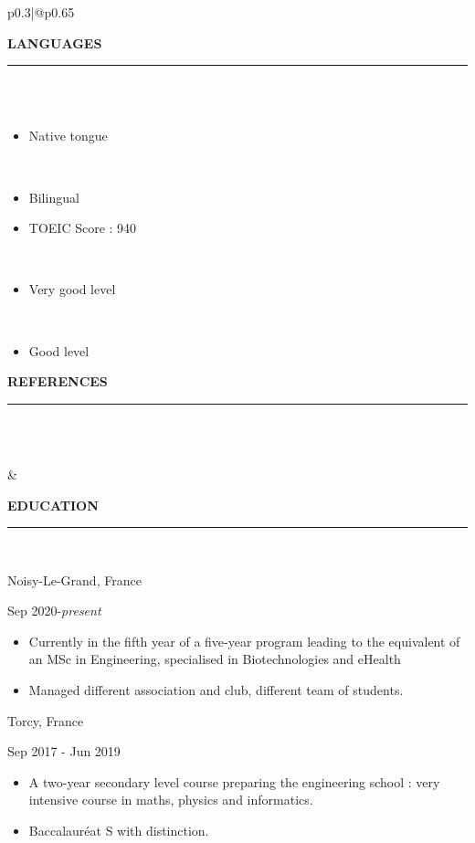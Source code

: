 \documentclass[12pt,a4paper]{article}
\newcommand{\myline}[1]{\rule{#1}{1.0pt}\\}
\newcommand{\topic}[1]{\textbf{\Large\selectfont\MakeUppercase{#1}}\\\vspace{-0.5cm}\myline{1.0cm}}
\newcommand{\subtopic}[1]{\textbf{\normalsize\selectfont{#1}}\\}
\newcommand{\lsubtopic}[3]{
  \begin{minipage}[t]{0.7\linewidth}
    \textbf{\normalsize\selectfont{#1}}
  \end{minipage}
  \hfill
  \begin{minipage}[t]{0.25\linewidth}
    \raggedleft
    {#2\\}
  \end{minipage}
  \par
}
\begin{document}
\begin{multicols}{2}
\begin{tabular}{p{0.3\textwidth}|@{\hspace{5mm}}p{0.65\textwidth}}
{\begin{flushleft}
\topic{Languages}
\subtopic{French} %
\vspace{-1em} 
\begin{itemize}
    \setlength\itemsep{-0.5em}
    \item Native tongue
\end{itemize}
\vspace{-1em} 
\subtopic{English} %
\vspace{-1em} 
\begin{itemize}
    \setlength\itemsep{-0.5em}
    \item Bilingual
    \item TOEIC Score : 940
\end{itemize}
\vspace{-1em} 
\subtopic{Portuguese} %
\vspace{-1em} 
\begin{itemize}
    \setlength\itemsep{-0.5em}
    \item Very good level   
\end{itemize}
\vspace{-1em} 
\subtopic{Spanish} %
\vspace{-1em} 
\begin{itemize}
    \setlength\itemsep{-0.5em}
    \item Good level
\end{itemize}

\topic{References}
\setlength\itemsep{-0.5em}
\subtopic{On demand}
\end{flushleft}
}
&
{
\begin{flushleft}
    
     
    \topic{education} %
    \lsubtopic{Engineering school, ESIEE Paris }{Noisy-Le-Grand, France} 
        \centering
        Sep 2020-\textit{present}
    \begin{itemize}
        \setlength\itemsep{-0.5em}
        \item Currently in the fifth year of a five-year program leading to the equivalent of an MSc in Engineering, specialised in Biotechnologies and eHealth
        \item Managed different association and club, different team of students.
    \end{itemize}
  
\lsubtopic{College preparing class, Lycee Jean Moulin}{Torcy, France}
    \centering
    Sep 2017 - Jun 2019
\begin{itemize}
    \setlength\itemsep{-0.5em}
    \item A two-year secondary level course preparing the engineering school : very intensive course in maths, physics and informatics.
    \item Baccalauréat S with distinction.
\end{itemize}


\end{flushleft}}
\end{tabular}
\end{multicols}
\end{document}
